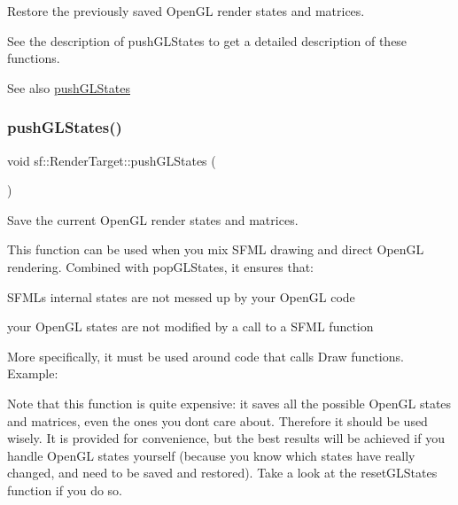 Restore the previously saved Open\+GL render states and matrices. 

See the description of push\+G\+L\+States to get a detailed description of these functions.

\begin{DoxySeeAlso}{See also}
\mbox{\hyperlink{classsf_1_1_render_target_a8d1998464ccc54e789aaf990242b47f7}{push\+G\+L\+States}} \begin{DoxyVerb}\end{DoxyVerb}
 
\end{DoxySeeAlso}
\mbox{\label{classsf_1_1_render_target_a8d1998464ccc54e789aaf990242b47f7}} 
\subsubsection{\texorpdfstring{pushGLStates()}{pushGLStates()}}
{\footnotesize\ttfamily void sf\+::\+Render\+Target\+::push\+G\+L\+States (\begin{DoxyParamCaption}{ }\end{DoxyParamCaption})}



Save the current Open\+GL render states and matrices. 

This function can be used when you mix S\+F\+ML drawing and direct Open\+GL rendering. Combined with pop\+G\+L\+States, it ensures that\+: \begin{DoxyItemize}
\item S\+F\+ML\textquotesingle{}s internal states are not messed up by your Open\+GL code \item your Open\+GL states are not modified by a call to a S\+F\+ML function\end{DoxyItemize}
More specifically, it must be used around code that calls Draw functions. Example\+: 
\begin{DoxyCode}{0}
\DoxyCodeLine{\textcolor{comment}{// OpenGL code here...}}
\DoxyCodeLine{\textcolor{comment}{// OpenGL code here...}}
\end{DoxyCode}


Note that this function is quite expensive\+: it saves all the possible Open\+GL states and matrices, even the ones you don\textquotesingle{}t care about. Therefore it should be used wisely. It is provided for convenience, but the best results will be achieved if you handle Open\+GL states yourself (because you know which states have really changed, and need to be saved and restored). Take a look at the reset\+G\+L\+States function if you do so.

